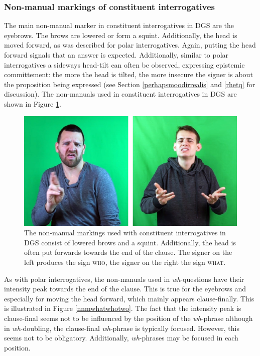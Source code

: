 \subsubsection{Non-manual markings of constituent interrogatives}
The main non-manual marker in constituent interrogatives in DGS are the eyebrows. The brows are lowered or form a squint. Additionally, the head is moved forward, as was described for polar interrogatives. Again, putting the head forward signals that an answer is expected. Additionally, similar to polar interrogatives a sideways head-tilt can often be observed, expressing epistemic committement: the more the head is tilted, the more insecure the signer is about the proposition being expressed (see Section \ref{perhapsmoodirrealis} and \ref{rhetq} for discussion). The non-manuals used in constituent interrogatives in DGS are shown in Figure \ref{nnmwhatwho}. 

\begin{figure}[bt]
\centering
	\includegraphics[width=1.0\textwidth]{nnmwhatwho.jpg}
	\caption{The non-manual markings used with constituent interrogatives in DGS consist of lowered brows and a squint. Additionally, the head is often put forwards towards the end of the clause. The signer on the left produces the sign \textsc{who}, the signer on the right the sign \textsc{what}.}
	\label{nnmwhatwho}
\end{figure}

As with polar interrogatives, the non-manuals used in \textit{wh}-questions have their intensity peak towards the end of the clause. This is true for the eyebrows and especially for moving the head forward, which mainly appears clause-finally. This is illustrated in Figure \ref{nnmwhatwhotwo}. The fact that the intensity peak is clause-final seems not to be influenced by the position of the \textit{wh}-phrase although in \textit{wh}-doubling, the clause-final \textit{wh}-phrase is typically focused. However, this seems not to be obligatory. Additionally, \textit{wh}-phrases may be focused in each position. 


